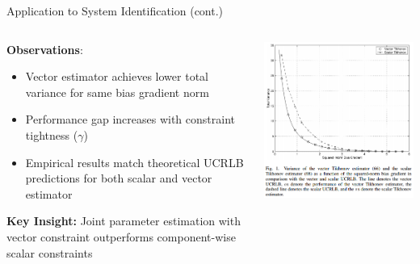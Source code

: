\documentclass{beamer}
\begin{document}
\begin{frame}{Application to System Identification (cont.)}
\begin{columns}[T]
    \begin{column}{0.5\textwidth}
        \textbf{Observations}:
        \begin{itemize}
            \item Vector estimator achieves lower total variance for same bias gradient norm
            \item Performance gap increases with constraint tightness ($\gamma$)
            \item Empirical results match theoretical UCRLB predictions for both scalar and vector estimator
        \end{itemize}
        \vspace{0.3cm}
        \textbf{Key Insight:} Joint parameter estimation with vector constraint outperforms 
        component-wise scalar constraints
    \end{column}
    \begin{column}{0.5\textwidth}
        \includegraphics[width=\linewidth]{figures/fig1.png}
    \end{column}
\end{columns}
\end{frame}
\end{document}

